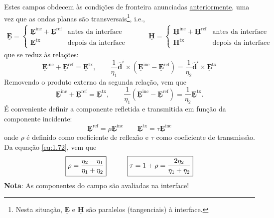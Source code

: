 Estes campos obdecem às condições de fronteira anunciadas \hyperref[sec:boundary-conditions-waves]{anteriormente}, uma vez que as ondas planas são transversais\footnote{Nesta situação, $\mathbf{\underline{E}}$ e $\mathbf{\underline{H}}$ são paralelos (tangenciais) à interface.}, i.e.,
\begin{equation}
    \begin{aligned}
        \mathbf{\underline{E}} =
        \begin{cases}
            \mathbf{\underline{E}}^{\text{inc}} + \mathbf{\underline{E}}^{\text{ref}} & \text{antes da interface} \\
            \mathbf{\underline{E}}^{\text{tx}} & \text{depois da interface}
        \end{cases}
        \qquad\quad
        \mathbf{\underline{H}} = 
        \begin{cases}
            \mathbf{\underline{H}}^{\text{inc}} + \mathbf{\underline{H}}^{\text{ref}} & \text{antes da interface} \\
            \mathbf{\underline{H}}^{\text{tx}} & \text{depois da interface}
        \end{cases}
    \end{aligned}
\end{equation}
que se reduz às relações:
\begin{equation} \label{eq:1.72}
    \mathbf{\underline{E}}^{\text{inc}} + \mathbf{\underline{E}}^{\text{ref}} = \mathbf{\underline{E}}^{\text{tx}},
    \qquad
    \frac{1}{\eta_1}\mathbf{\hat{d}}^i \times (\mathbf{\underline{E}}^{\text{inc}} - \mathbf{\underline{E}}^{\text{ref}}) = \frac{1}{\eta_2}\mathbf{\hat{d}}^i \times \mathbf{\underline{E}}^{\text{tx}}
\end{equation}
Removendo o produto externo da segunda relação, vem que
\begin{equation}
    \mathbf{\underline{E}}^{\text{inc}} + \mathbf{\underline{E}}^{\text{ref}} = \mathbf{\underline{E}}^{\text{tx}},
    \qquad
    \frac{1}{\eta_1} (\mathbf{\underline{E}}^{\text{inc}} - \mathbf{\underline{E}}^{\text{ref}}) = \frac{1}{\eta_2} \mathbf{\underline{E}}^{\text{tx}}.
\end{equation}
É conveniente definir a componente refletida e transmitida em função da componente incidente:
\begin{equation}
    \mathbf{\underline{E}}^{\text{ref}} = \rho \mathbf{\underline{E}}^{\text{inc}}
    \qquad
    \mathbf{\underline{E}}^{\text{tx}} = \tau \mathbf{\underline{E}}^{\text{inc}}
\end{equation}
onde $\rho$ é definido como coeficiente de reflexão e $\tau$ como coeficiente de transmissão. Da equação \ref{eq:1.72}, vem que
\begin{equation}
    \boxed{%
        \rho = \frac{\eta_2 - \eta_1}{\eta_1 + \eta_2}
    }
    \qquad\quad
    \boxed{%
        \tau = 1 + \rho = \frac{2\eta_2}{\eta_1 + \eta_2}
    }
\end{equation}
\textbf{Nota}: As componentes do campo são avaliadas na interface!

